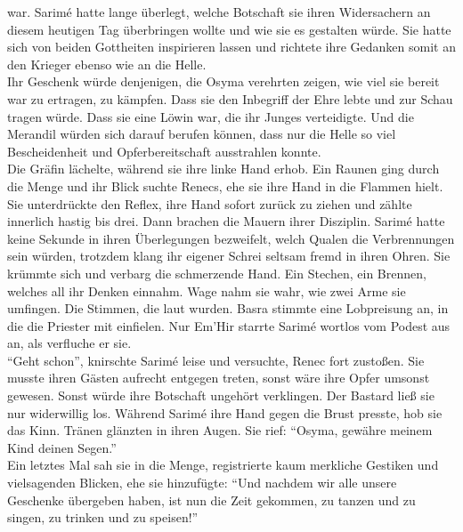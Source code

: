 war. Sarimé hatte lange überlegt, welche Botschaft sie ihren Widersachern an diesem heutigen Tag 
überbringen wollte und wie sie es gestalten würde. Sie hatte sich von beiden Gottheiten inspirieren 
lassen und richtete ihre Gedanken somit an den Krieger ebenso wie an die Helle.\\
Ihr Geschenk würde denjenigen, die Osyma verehrten zeigen, wie viel sie bereit war zu ertragen, zu 
kämpfen. Dass sie den Inbegriff der Ehre lebte und zur Schau tragen würde. Dass sie eine Löwin war, 
die ihr Junges verteidigte. Und die Merandil würden sich darauf berufen können, dass nur die Helle 
so viel Bescheidenheit und Opferbereitschaft ausstrahlen konnte.\\
Die Gräfin lächelte, während sie ihre linke Hand erhob. Ein Raunen ging durch die Menge und ihr 
Blick suchte Renecs, ehe sie ihre Hand in die Flammen hielt. Sie unterdrückte den Reflex, ihre Hand 
sofort zurück zu ziehen und zählte innerlich hastig bis drei. Dann brachen die Mauern ihrer Disziplin. 
Sarimé hatte keine Sekunde in ihren Überlegungen bezweifelt, welch Qualen die Verbrennungen sein 
würden, trotzdem klang ihr eigener Schrei seltsam fremd in ihren Ohren. Sie krümmte sich und verbarg 
die schmerzende Hand. Ein Stechen, ein Brennen, welches all ihr Denken einnahm. Wage nahm sie wahr, 
wie zwei Arme sie umfingen. Die Stimmen, die laut wurden. Basra stimmte eine Lobpreisung an, in die 
die Priester mit einfielen. Nur Em'Hir starrte Sarimé wortlos vom Podest aus an, als verfluche er 
sie.\\
``Geht schon'', knirschte Sarimé leise und versuchte, Renec fort zustoßen. Sie musste 
ihren Gästen aufrecht entgegen treten, sonst wäre ihre Opfer umsonst gewesen. Sonst würde ihre 
Botschaft ungehört verklingen. Der Bastard ließ sie nur widerwillig los. Während Sarimé ihre Hand 
gegen die Brust presste, hob sie das Kinn. Tränen glänzten in ihren Augen. Sie rief: ``Osyma, 
gewähre meinem Kind deinen Segen.''\\
Ein letztes Mal sah sie in die Menge, registrierte kaum merkliche Gestiken und vielsagenden 
Blicken, ehe sie hinzufügte: ``Und nachdem wir alle unsere Geschenke übergeben haben, ist nun die 
Zeit gekommen, zu tanzen und zu singen, zu trinken und zu speisen!''\\

